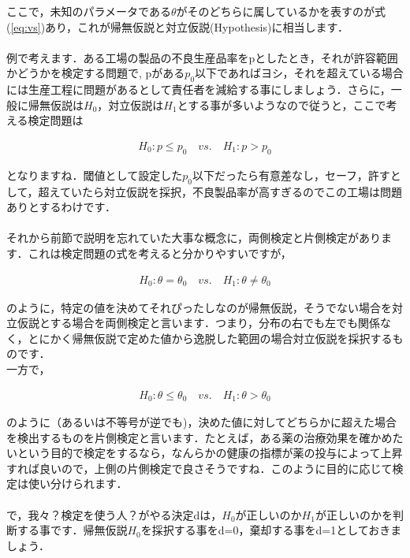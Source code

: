 \documentclass[11pt,a4paper,uplatex]{ujreport} 	%
\begin{document}
ここで，未知のパラメータである$\theta$がそのどちらに属しているかを表すのが式(\ref{eq:vs})あり，これが帰無仮説と対立仮説(Hypothesis)に相当します．\\\\

例で考えます．ある工場の製品の不良生産品率をpとしたとき，それが許容範囲かどうかを検定する問題で, pがある$p_0$以下であればヨシ，それを超えている場合には生産工程に問題があるとして責任者を減給する事にしましょう．さらに，一般に帰無仮説は$H_0$，対立仮説は$H_1$とする事が多いようなので従うと，ここで考える検定問題は

\begin{align}
 H_0 :p\leq p_0 \quad vs. \quad H_1 :p> p_0 
\end{align}

となりますね．閾値として設定した$p_0$以下だったら有意差なし，セーフ，許すとして，超えていたら対立仮説を採択，不良製品率が高すぎるのでこの工場は問題ありとするわけです．\\
\\

それから前節で説明を忘れていた大事な概念に，両側検定と片側検定があります．これは検定問題の式を考えると分かりやすいですが，

\begin{align}
  H_0:\theta = \theta_0\quad vs. \quad H_1:\theta \neq \theta_0
\end{align}

のように，特定の値を決めてそれぴったしなのが帰無仮説，そうでない場合を対立仮説とする場合を両側検定と言います．つまり，分布の右でも左でも関係なく，とにかく帰無仮説で定めた値から逸脱した範囲の場合対立仮説を採択するものです．\\

一方で，

\begin{align}
  H_0:\theta \leq \theta_0 \quad vs. \quad H_1 : \theta > \theta_0
\end{align}

のように（あるいは不等号が逆でも)，決めた値に対してどちらかに超えた場合を検出するものを片側検定と言います．たとえば，ある薬の治療効果を確かめたいという目的で検定をするなら，なんらかの健康の指標が薬の投与によって上昇すれば良いので，上側の片側検定で良さそうですね．このように目的に応じて検定は使い分けられます．\\\\

で，我々？検定を使う人？がやる決定dは，$H_0$が正しいのか$H_1$が正しいのかを判断する事です．帰無仮説$H_0$を採択する事をd=0，棄却する事をd=1としておきましょう．\\
\end{document}

